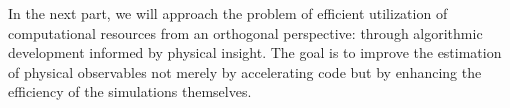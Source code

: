 In the next part, we will approach the problem of efficient utilization of computational resources from an orthogonal perspective: through algorithmic development informed by physical insight.
The goal is to improve the estimation of physical observables not merely by accelerating code but by enhancing the efficiency of the simulations themselves.

